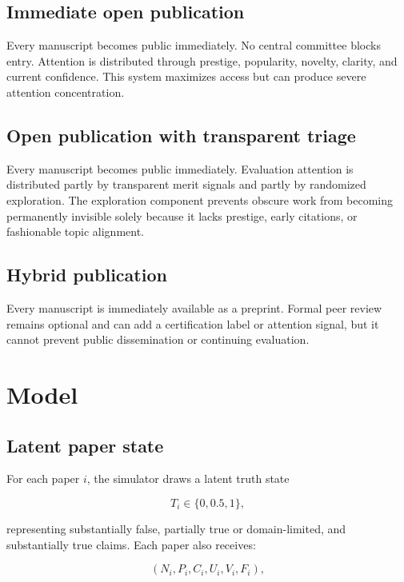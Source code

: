 \documentclass[11pt]{article}
\begin{document}
\subsection{Immediate open publication}

Every manuscript becomes public immediately. No central committee blocks entry. Attention is distributed through prestige, popularity, novelty, clarity, and current confidence. This system maximizes access but can produce severe attention concentration.

\subsection{Open publication with transparent triage}

Every manuscript becomes public immediately. Evaluation attention is distributed partly by transparent merit signals and partly by randomized exploration. The exploration component prevents obscure work from becoming permanently invisible solely because it lacks prestige, early citations, or fashionable topic alignment.

\subsection{Hybrid publication}

Every manuscript is immediately available as a preprint. Formal peer review remains optional and can add a certification label or attention signal, but it cannot prevent public dissemination or continuing evaluation.

\section{Model}

\subsection{Latent paper state}

For each paper $i$, the simulator draws a latent truth state

\begin{equation}
T_i \in \{0, 0.5, 1\},
\end{equation}

representing substantially false, partially true or domain-limited, and substantially true claims. Each paper also receives:

\begin{equation}
(N_i, P_i, C_i, U_i, V_i, F_i),
\end{equation}
\end{document}
